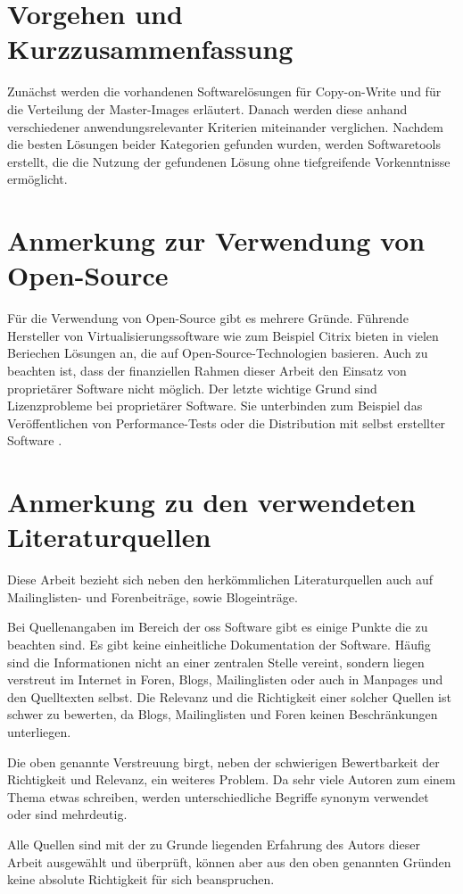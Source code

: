 \section{Vorgehen und Kurzzusammenfassung} 
Zunächst werden die vorhandenen Softwarelösungen für Copy-on-Write und für die Verteilung der Master-Images erläutert. Danach werden diese anhand verschiedener anwendungsrelevanter Kriterien miteinander verglichen. Nachdem die besten Lösungen beider Kategorien gefunden wurden, werden Softwaretools erstellt, die die Nutzung der gefundenen Lösung ohne tiefgreifende Vorkenntnisse ermöglicht.

\section{Anmerkung zur Verwendung von Open-Source}\label{opensource}
Für die Verwendung von Open-Source gibt es mehrere Gründe. Führende Hersteller von Virtualisierungssoftware wie zum Beispiel Citrix bieten in vielen Beriechen Lösungen an, die auf Open-Source-Technologien basieren. Auch zu beachten ist, dass der finanziellen Rahmen dieser Arbeit den Einsatz von proprietärer Software nicht möglich. Der letzte wichtige Grund sind Lizenzprobleme bei proprietärer Software. Sie unterbinden zum Beispiel das Veröffentlichen von Performance-Tests oder die Distribution mit selbst erstellter Software \cite{Vmware}. 

\section{Anmerkung zu den verwendeten Literaturquellen}
Diese Arbeit bezieht sich neben den herkömmlichen Literaturquellen auch auf Mailinglisten- und Forenbeiträge, sowie Blogeinträge.

Bei Quellenangaben im Bereich der \gls{oss} Software gibt es einige Punkte die zu beachten sind. Es gibt keine einheitliche Dokumentation der Software. Häufig sind die Informationen nicht an einer zentralen Stelle vereint, sondern liegen verstreut im Internet in Foren, Blogs, Mailinglisten oder auch in Manpages und den Quelltexten selbst. Die Relevanz und die Richtigkeit einer solcher Quellen ist schwer zu bewerten, da Blogs, Mailinglisten und Foren keinen Beschränkungen unterliegen. \begin{comment} Das heißt, jeder der Willens ist zu einem Thema etwas zu schreiben, kann dies auch tun. \end{comment} 

Die oben genannte Verstreuung birgt, neben der schwierigen Bewertbarkeit der Richtigkeit und Relevanz, ein weiteres Problem. Da sehr viele Autoren zum einem Thema etwas schreiben, werden unterschiedliche Begriffe synonym verwendet oder sind mehrdeutig.

Alle Quellen sind mit der zu Grunde liegenden Erfahrung des Autors dieser Arbeit ausgewählt und überprüft, können aber aus den oben genannten Gründen keine absolute Richtigkeit für sich beanspruchen.
